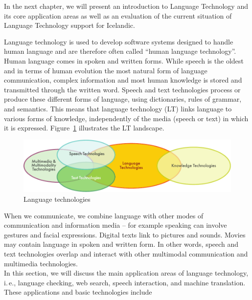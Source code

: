 \begin{multicols}{2}
In the next chapter, we will present an introduction to Language Technology and its core application areas as well as an evaluation of the current situation of Language Technology support for Icelandic.
\end{multicols}

\clearpage


\begin{multicols}{2}

Language technology is used to develop software systems designed to handle human language and are therefore often called “human language technology”. Human language comes in spoken and written forms. While speech is the oldest and in terms of human evolution the most natural form of language communication, complex information and most human knowledge is stored and transmitted through the written word. Speech and text technologies process or produce these different forms of language, using dictionaries, rules of grammar, and semantics. This means that language technology (LT) links language to various forms of knowledge, independently of the media (speech or text) in which it is expressed. Figure~\ref{fig:ltincontext_en} illustrates the LT landscape.

\begin{figure}[htb]
  \center
  \includegraphics[width=\textwidth]{../_media/english/language_technologies}
  \caption{Language technologies}
\label{fig:ltincontext_en}
\end{figure}

When we communicate, we combine language with other modes of communication and information media -- for example speaking can involve gestures and facial expressions. Digital texts link to pictures and sounds. Movies may contain language in spoken and written form. In other words, speech and text technologies overlap and interact with other multimodal communication and multimedia technologies.\\ 
In this section, we will discuss the main application areas of language technology, i.\,e., language checking, web search, speech interaction, and machine translation. These applications and basic technologies include 


\end{multicols}
